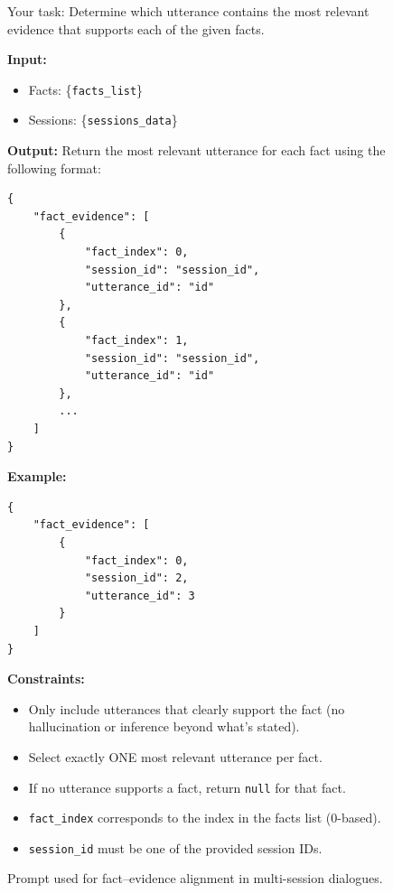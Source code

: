 \documentclass{article} %
\begin{document}
\begin{figure}[t]
\begin{tcolorbox}[
colframe=black!75!white,
colback=white, sharp corners,
boxrule=0.8pt, width=\textwidth,
title=Prompt for Fact–Evidence Alignment
]

Your task:  
Determine which utterance contains the most relevant evidence that supports each of the given facts.

\textbf{Input:}
\begin{itemize}
  \item Facts: \{\texttt{facts\_list}\}
  \item Sessions: \{\texttt{sessions\_data}\}
\end{itemize}

\textbf{Output:}  
Return the most relevant utterance for each fact using the following format:

\begin{verbatim}
{
    "fact_evidence": [
        {
            "fact_index": 0,
            "session_id": "session_id",
            "utterance_id": "id"
        },
        {
            "fact_index": 1,
            "session_id": "session_id",
            "utterance_id": "id"
        },
        ...
    ]
}
\end{verbatim}

\textbf{Example:}
\begin{verbatim}
{
    "fact_evidence": [
        {
            "fact_index": 0,
            "session_id": 2,
            "utterance_id": 3
        }
    ]
}
\end{verbatim}

\textbf{Constraints:}
\begin{itemize}
  \item Only include utterances that clearly support the fact (no hallucination or inference beyond what's stated).
  \item Select exactly ONE most relevant utterance per fact.
  \item If no utterance supports a fact, return \texttt{null} for that fact.
  \item \texttt{fact\_index} corresponds to the index in the facts list (0-based).
  \item \texttt{session\_id} must be one of the provided session IDs.
\end{itemize}

\end{tcolorbox}
\caption{Prompt used for fact–evidence alignment in multi-session dialogues.}
\label{fig:fact-evidence-prompt}
\end{figure}
\end{document}

